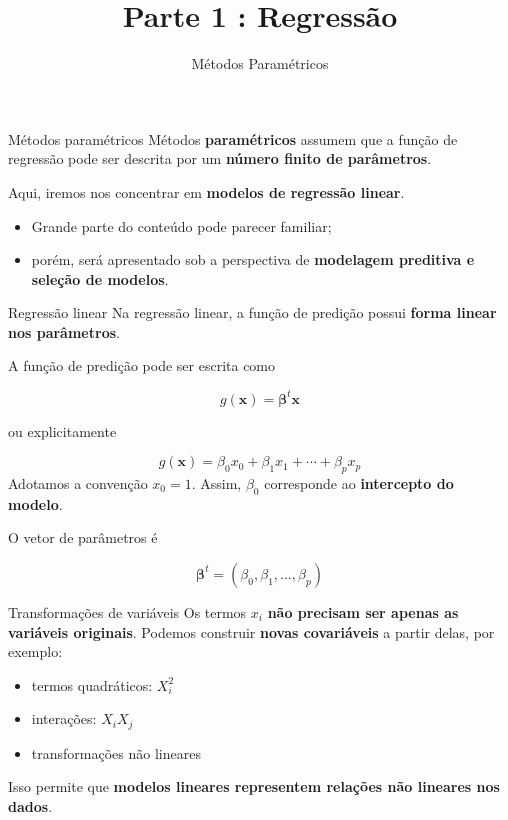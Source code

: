 \documentclass[
  ignorenonframetext,
  aspectratio=169,
]{beamer}
\title{Parte 1 : Regressão}
\subtitle{{Métodos Paramétricos}}
\author{}
\date{}
\providecommand{\tightlist}{%
  \setlength{\itemsep}{0pt}\setlength{\parskip}{0pt}}
\begin{document}
\frame{\titlepage}


\begin{frame}{Métodos paramétricos}
\label{muxe9todos-paramuxe9tricos}
Métodos \textbf{paramétricos} assumem que a função de regressão pode ser
descrita por um \textbf{número finito de parâmetros}.

Aqui, iremos nos concentrar em \textbf{modelos de regressão linear}.

\begin{itemize}
\tightlist
\item
  Grande parte do conteúdo pode parecer familiar;
\item
  porém, será apresentado sob a perspectiva de \textbf{modelagem
  preditiva e seleção de modelos}.
\end{itemize}
\end{frame}

\begin{frame}{Regressão linear}
\label{regressuxe3o-linear}
Na regressão linear, a função de predição possui \textbf{forma linear
nos parâmetros}.

A função de predição pode ser escrita como

\[
g(\mathbf{x}) = \boldsymbol{\beta}^t \mathbf{x}
\]

ou explicitamente

\[
g(\mathbf{x}) = \beta_0 x_0 + \beta_1 x_1 + \cdots + \beta_p x_p
\] Adotamos a convenção \(x_0 = 1\). Assim, \(\beta_0\) corresponde ao
\textbf{intercepto do modelo}.

O vetor de parâmetros é

\[
\boldsymbol{\beta}^t = (\beta_0, \beta_1, \ldots, \beta_p)
\]
\end{frame}

\begin{frame}
\begin{block}{Transformações de variáveis}
\label{transformauxe7uxf5es-de-variuxe1veis}
Os termos \(x_i\) \textbf{não precisam ser apenas as variáveis
originais}. Podemos construir \textbf{novas covariáveis} a partir delas,
por exemplo:

\begin{itemize}
\tightlist
\item
  termos quadráticos: \(X_i^2\)
\item
  interações: \(X_i X_j\)
\item
  transformações não lineares
\end{itemize}

Isso permite que \textbf{modelos lineares representem relações não
lineares nos dados}.
\end{block}
\end{frame}
\end{document}
